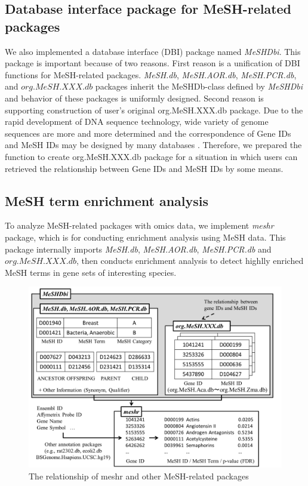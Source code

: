 \documentclass[11pt]{article}
\newcommand{\Rpackage}[1]{{\textit{#1}}}
\begin{document}
\subsection{Database interface package for MeSH-related packages}
We also implemented a database interface (DBI) package named \Rpackage{MeSHDbi}. This package is important because of two reasons. First reason is a unification of DBI functions for MeSH-related packages. \Rpackage{MeSH.db}, \Rpackage{MeSH.AOR.db}, \Rpackage{MeSH.PCR.db}, and $org.MeSH.XXX.db$ packages inherit the MeSHDb-class defined by \Rpackage{MeSHDbi} and behavior of these packages is uniformly designed. Second reason is supporting construction of user's original org.MeSH.XXX.db package. Due to the rapid development of DNA sequence technology, wide variety of genome sequences are more and more determined and the correspondence of Gene IDs and MeSH IDs may be designed by many databases \cite{Nakazato2007, Nakazato2009, Saurin2010, Sartor2012}. Therefore, we prepared the function to create org.MeSH.XXX.db package for a situation in which users can retrieved the relationship between Gene IDs and MeSH IDs by some means.

\subsection{MeSH term enrichment analysis}
To analyze MeSH-related packages with omics data, we implement \Rpackage{meshr} package, which is for conducting enrichment analysis using MeSH data. This package internally imports \Rpackage{MeSH.db}, \Rpackage{MeSH.AOR.db}, \Rpackage{MeSH.PCR.db} and $org.MeSH.XXX.db$, then conducts enrichment analysis to detect highlly enriched MeSH terms in gene sets of interesting species.
\begin{figure}[ht]
\centering
\includegraphics[width=\linewidth]{fig4.png}
\caption{The relationship of meshr and other MeSH-related packages}
\label{fig4}
\end{figure}
\clearpage
\end{document}
